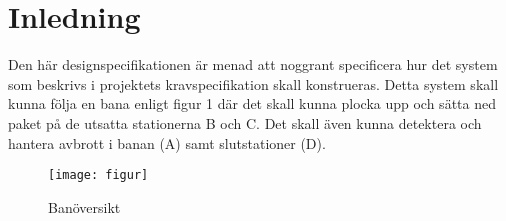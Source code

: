 \section{Inledning}
Den här designspecifikationen är menad att noggrant specificera hur det system som beskrivs i projektets kravspecifikation skall konstrueras. Detta system skall kunna följa en bana enligt figur 1 där det skall kunna plocka upp och sätta ned paket på de utsatta stationerna B och C. Det skall även kunna detektera och hantera avbrott i banan (A) samt slutstationer (D). 

\begin{figure}[h]
\center
\texttt{[image: figur]}
\caption{Banöversikt} \label{systemskiss:banoversikt}
\end{figure}